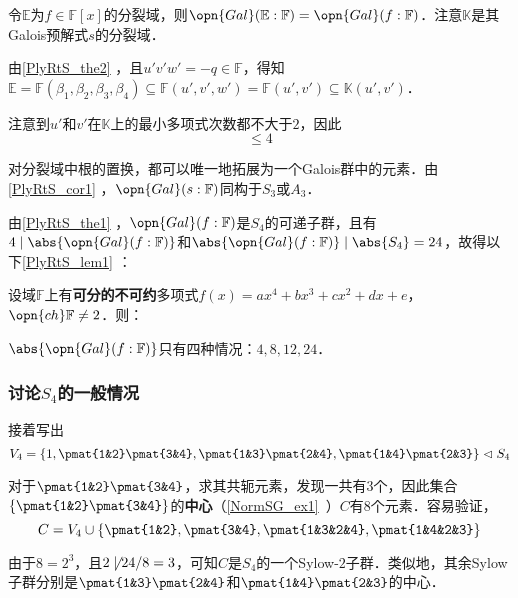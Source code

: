 令$\mathbb{E}$为$f\in\mathbb{F}[x]$的分裂域，则$\opn{Gal}(\mathbb{E}:\mathbb{F})=\opn{Gal}(f:\mathbb{F})$．注意$\mathbb{K}$是其Galois预解式$s$的分裂域．

由\autoref{PlyRtS_the2} ，且$u'v'w'=-q\in\mathbb{F}$，得知$\mathbb{E}=\mathbb{F}(\beta_1, \beta_2, \beta_3, \beta_4)\subseteq\mathbb{F}(u', v', w')=\mathbb{F}(u', v')\subseteq\mathbb{K}(u', v')$．

注意到$u'$和$v'$在$\mathbb{K}$上的最小多项式次数都不大于$2$，因此
\begin{equation}
[\mathbb{E}:\mathbb{K}]\leq 4
\end{equation}

对分裂域中根的置换，都可以唯一地拓展为一个Galois群中的元素．由\autoref{PlyRtS_cor1} ，$\opn{Gal}(s:\mathbb{F})$同构于$S_3$或$A_3$．

由\autoref{PlyRtS_the1} ，$\opn{Gal}(f:\mathbb{F})$是$S_4$的可递子群，且有$4\mid\abs{\opn{Gal}(f:\mathbb{F})}$和$\abs{\opn{Gal}(f:\mathbb{F})}\mid \abs{S_4}=24$，故得以下\autoref{PlyRtS_lem1} ：

\begin{lemma}{}\label{PlyRtS_lem1}
设域$\mathbb{F}$上有\textbf{可分的不可约}多项式$f(x)=ax^4+bx^3+cx^2+dx+e$，$\opn{ch}\mathbb{F}\neq 2$．则：

$\abs{\opn{Gal}(f:\mathbb{F})}$只有四种情况：$4, 8, 12, 24$．
\end{lemma}



\subsubsection{讨论$S_4$的一般情况}




接着写出
\begin{equation}
V_4=\{1, \pmat{1&2}\pmat{3&4}, \pmat{1&3}\pmat{2&4}, \pmat{1&4}\pmat{2&3}\}\vartriangleleft S_4
\end{equation}

对于$\pmat{1&2}\pmat{3&4}$，求其共轭元素，发现一共有$3$个，因此集合$\{\pmat{1&2}\pmat{3&4}\}$的\textbf{中心}（\autoref{NormSG_ex1}~）$C$有$8$个元素．容易验证，
\begin{equation}
C = V_4\cup\{\pmat{1&2}, \pmat{3&4}, \pmat{1&3&2&4}, \pmat{1&4&2&3}\}
\end{equation}

由于$8=2^3$，且$2\not\mid 24/8=3$，可知$C$是$S_4$的一个Sylow-$2$子群．类似地，其余Sylow子群分别是$\pmat{1&3}\pmat{2&4}$和$\pmat{1&4}\pmat{2&3}$的中心．

